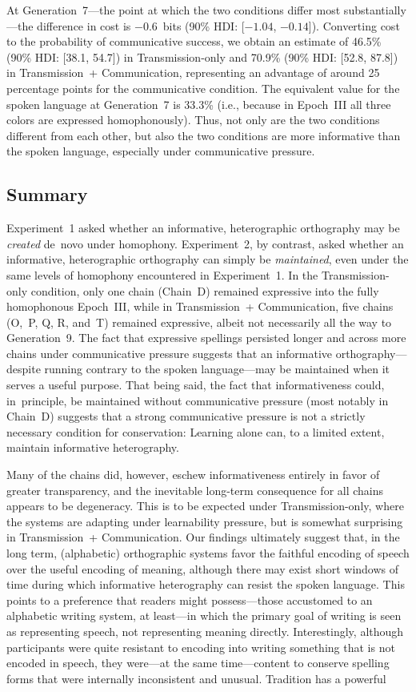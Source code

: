 \documentclass[doc,biblatex]{apa7}
\begin{document}
At Generation~7---the point at which the two conditions differ most substantially---the difference in cost is $-0.6$~bits (90\% HDI: [$-1.04$, $-0.14$]). Converting cost to the probability of communicative success, we obtain an estimate of 46.5\% (90\% HDI: [38.1, 54.7]) in Transmission-only and 70.9\% (90\% HDI: [52.8, 87.8]) in Transmission~+ Communication, representing an advantage of around 25 percentage points for the communicative condition. The equivalent value for the spoken language at Generation~7 is 33.3\% (i.e., because in Epoch~III all three colors are expressed homophonously). Thus, not only are the two conditions different from each other, but also the two conditions are more informative than the spoken language, especially under communicative pressure.

\subsection{Summary}

Experiment~1 asked whether an informative, heterographic orthography may be \textit{created} de~novo under homophony. Experiment~2, by contrast, asked whether an informative, heterographic orthography can simply be \textit{maintained}, even under the same levels of homophony encountered in Experiment~1. In the Transmission-only condition, only one chain (Chain~D) remained expressive into the fully homophonous Epoch~III, while in Transmission~+ Communication, five chains (O,~P, Q, R, and~T) remained expressive, albeit not necessarily all the way to Generation~9. The fact that expressive spellings persisted longer and across more chains under communicative pressure suggests that an informative orthography---despite running contrary to the spoken language---may be maintained when it serves a useful purpose. That being said, the fact that informativeness could, in~principle, be maintained without communicative pressure (most notably in Chain~D) suggests that a strong communicative pressure is not a strictly necessary condition for conservation: Learning alone can, to a limited extent, maintain informative heterography.

Many of the chains did, however, eschew informativeness entirely in favor of greater transparency, and the inevitable long-term consequence for all chains appears to be degeneracy. This is to be expected under Transmission-only, where the systems are adapting under learnability pressure, but is somewhat surprising in Transmission~+ Communication. Our findings ultimately suggest that, in the long term, (alphabetic) orthographic systems favor the faithful encoding of speech over the useful encoding of meaning, although there may exist short windows of time during which informative heterography can resist the spoken language. This points to a preference that readers might possess---those accustomed to an alphabetic writing system, at least---in which the primary goal of writing is seen as representing speech, not representing meaning directly. Interestingly, although participants were quite resistant to encoding into writing something that is not encoded in speech, they were---at the same time---content to conserve spelling forms that were internally inconsistent and unusual. Tradition has a powerful
\end{document}
